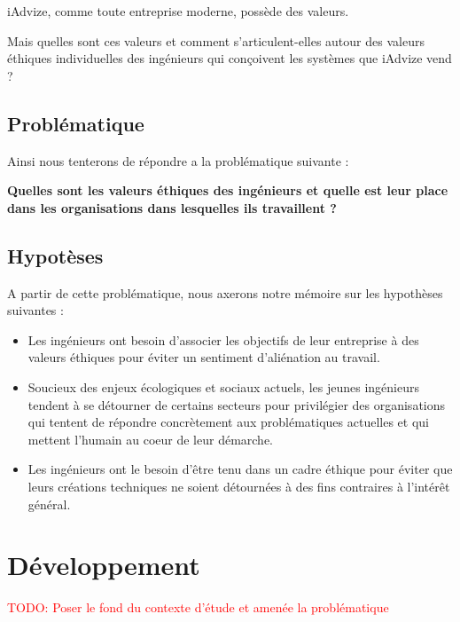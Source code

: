 \documentclass[12pt,a4paper]{report}
\begin{document}
iAdvize, comme toute entreprise moderne, possède des valeurs.

Mais quelles sont ces valeurs et comment s'articulent-elles autour des valeurs éthiques individuelles des ingénieurs qui conçoivent les systèmes que iAdvize vend ?

\section*{Problématique}

Ainsi nous tenterons de répondre a la problématique suivante :

\begin{center}
	\textbf{Quelles sont les valeurs éthiques des ingénieurs et quelle est leur place dans les organisations dans lesquelles ils travaillent ?}
\end{center}

\section*{Hypotèses}

A partir de cette problématique, nous axerons notre mémoire sur les hypothèses suivantes :

\begin{itemize}
	\item Les ingénieurs ont besoin d'associer les objectifs de leur entreprise à des valeurs éthiques pour éviter un sentiment d'aliénation au travail. \\
	\item Soucieux des enjeux écologiques et sociaux actuels, les jeunes ingénieurs tendent à se détourner de certains secteurs pour privilégier des organisations qui tentent de répondre concrètement aux problématiques actuelles et qui mettent l'humain au coeur de leur démarche.\\
	\item Les ingénieurs ont le besoin d'être tenu dans un cadre éthique pour éviter que leurs créations techniques ne soient détournées à des fins contraires à l'intérêt général.\\
\end{itemize}

\chapter{Développement}

\textcolor{red}{TODO: Poser le fond du contexte d'étude et amenée la problématique}
\end{document}

